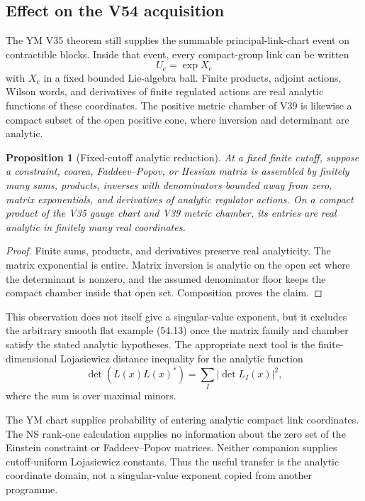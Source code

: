 \documentclass[11pt]{article}
\newtheorem{proposition}[theorem]{Proposition}
\begin{document}
\subsection{Effect on the V54 acquisition}

The YM V35 theorem still supplies the summable principal-link-chart
event on contractible blocks.  Inside that event, every compact-group
link can be written
\[
                             U_e=\exp X_e                    \tag{55.2}
\]
with \(X_e\) in a fixed bounded Lie-algebra ball.  Finite products,
adjoint actions, Wilson words, and derivatives of finite regulated
actions are real analytic functions of these coordinates.  The
positive metric chamber of V39 is likewise a compact subset of the
open positive cone, where inversion and determinant are analytic.

\begin{proposition}[Fixed-cutoff analytic reduction]
\label{prop:v11v55-analytic}
At a fixed finite cutoff, suppose a constraint, coarea,
Faddeev--Popov, or Hessian matrix is assembled by finitely many sums,
products, inverses with denominators bounded away from zero, matrix
exponentials, and derivatives of analytic regulator actions.  On a
compact product of the V35 gauge chart and V39 metric chamber, its
entries are real analytic in finitely many real coordinates.
\end{proposition}

\begin{proof}
Finite sums, products, and derivatives preserve real analyticity.
The matrix exponential is entire.  Matrix inversion is analytic on
the open set where the determinant is nonzero, and the assumed
denominator floor keeps the compact chamber inside that open set.
Composition proves the claim.
\end{proof}

This observation does not itself give a singular-value exponent, but
it excludes the arbitrary smooth flat example (54.13) once the matrix
family and chamber satisfy the stated analytic hypotheses.  The
appropriate next tool is the finite-dimensional Lojasiewicz distance
inequality for the analytic function
\[
                    \det(L(x)L(x)^*)
       =\sum_I|\det L_I(x)|^2,                                \tag{55.3}
\]
where the sum is over maximal minors.

\begin{transfer}
\label{trans:v11v55}
The YM chart supplies probability of entering analytic compact link
coordinates.  The NS rank-one calculation supplies no information
about the zero set of the Einstein constraint or Faddeev--Popov
matrices.  Neither companion supplies cutoff-uniform Lojasiewicz
constants.  Thus the useful transfer is the analytic coordinate
domain, not a singular-value exponent copied from another programme.
\end{transfer}
\end{document}

